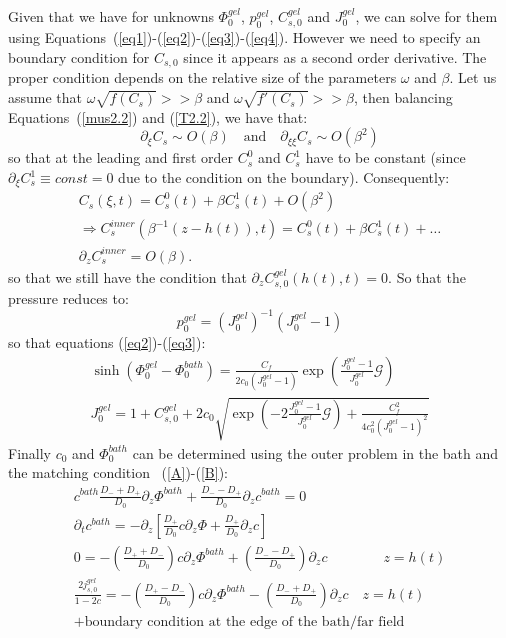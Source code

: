 \documentclass[12pt]{extarticle}
\begin{document}
Given that we have for unknowns $\Phi^{gel}_0$, $p^{gel}_0$, $C^{gel}_{s,0}$ and $J^{gel}_0$, we can solve for them using Equations~(\ref{eq1})-(\ref{eq2})-(\ref{eq3})-(\ref{eq4}). However we need to specify an boundary condition for $C_{s,0}$ since it appears as a second order derivative. The proper condition depends on the relative size of the parameters $\omega$ and $\beta$. Let us assume that \color{red}$\omega \sqrt{f(C_s)}>>\beta$ and $\omega \sqrt{f'(C_s)}>>\beta$, then balancing Equations~(\ref{mus2.2}) and (\ref{T2.2}), we have that:\color{black}
\begin{equation}
\partial_{\xi}C_s\sim O(\beta) \quad \text{and}\quad \partial_{\xi\xi}C_s\sim O(\beta^2)
\end{equation}
so that at the leading and first order $C^0_s$ and $C^1_s$ have to be constant (since $\partial_\xi C^1_s\equiv const = 0$ due to the condition on the boundary). Consequently:
\begin{equation}
\begin{aligned}
C_s(\xi,t)= C^0_s(t) + \beta C_s^1(t)+ O(\beta^2) \\
\Rightarrow C^{inner}_s(\beta^{-1}(z-h(t)),t) = C^0_s(t) + \beta C^1_s(t) + \ldots\\
\partial_z C^{inner}_s = O(\beta). 
\end{aligned}
\end{equation}
so that we still have the condition that $\partial_z C^{gel}_{s,0}(h(t),t)=0$.
So that the pressure reduces to:
\begin{equation}
p^{gel}_0 = (J^{gel}_0)^{-1}\left(J^{gel}_0-1\right)
\end{equation}
so that equations (\ref{eq2})-(\ref{eq3}):
\begin{gather}
\sinh(\Phi_0^{gel}-\Phi_0^{bath})= \frac{C_f}{2c_0 (J_0^{gel}-1)}\exp\left(\frac{J^{gel}_0-1}{J^{gel}_0}\mathcal{G}\right)\\
J^{gel}_0=1+C^{gel}_{s,0}+ 2c_0\sqrt{\exp\left(-2\frac{J^{gel}_0-1}{J^{gel}_0}\mathcal{G}\right)+\frac{C^2_f}{4c^2_0 (J_0^{gel}-1)^2}}
\end{gather}
Finally $c_0$ and $\Phi^{bath}_0$ can be determined using the outer problem in the bath and the matching condition ~(\ref{A})-(\ref{B}):
\begin{gather}
c^{bath} \frac{D_-+D_+}{D_0} \partial_z \Phi^{bath} + \frac{D_--D_+}{D_0} \partial_z c^{bath}=0\\
\partial_t c^{bath} = -\partial_z\left[\frac{D_+}{D_0} c \partial_z \Phi +\frac{D_+}{D_0} \partial_z c\right]\\
0= - \left(\frac{D_++D_-}{D_0}\right)c\partial_z \Phi^{bath} + \left(\frac{D_--D_+}{D_0}\right)\partial_z c \qquad \qquad z=h(t)\\
\frac{2j_{s,0}^{gel}}{1-2c} =- \left(\frac{D_+-D_-}{D_0}\right)c\partial_z \Phi^{bath} - \left(\frac{D_-+D_+}{D_0}\right)\partial_z c \quad z=h(t)\\
+ \text{boundary condition at the edge of the bath/far field}
\end{gather}
\end{document}
